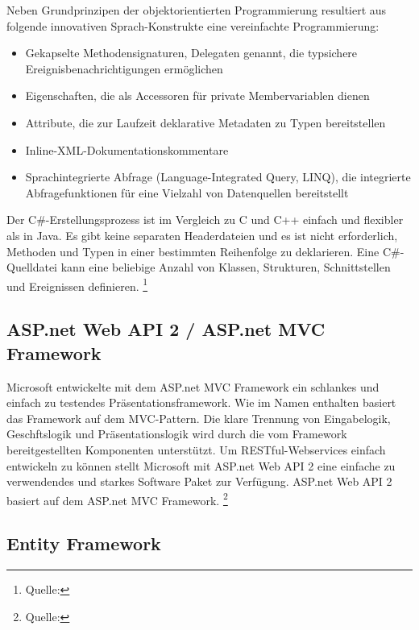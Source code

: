 Neben Grundprinzipen der objektorientierten Programmierung resultiert
aus folgende innovativen Sprach-Konstrukte eine vereinfachte
Programmierung:

\begin{itemize}
\tightlist
\item
  Gekapselte Methodensignaturen, Delegaten genannt, die typsichere
  Ereignisbenachrichtigungen ermöglichen
\item
  Eigenschaften, die als Accessoren für private Membervariablen dienen
\item
  Attribute, die zur Laufzeit deklarative Metadaten zu Typen
  bereitstellen
\item
  Inline-XML-Dokumentationskommentare
\item
  Sprachintegrierte Abfrage (Language-Integrated Query, LINQ), die
  integrierte Abfragefunktionen für eine Vielzahl von Datenquellen
  bereitstellt
\end{itemize}

Der C\#-Erstellungsprozess ist im Vergleich zu C und C++ einfach und
flexibler als in Java. Es gibt keine separaten Headerdateien und es ist
nicht erforderlich, Methoden und Typen in einer bestimmten Reihenfolge
zu deklarieren. Eine C\#-Quelldatei kann eine beliebige Anzahl von
Klassen, Strukturen, Schnittstellen und Ereignissen definieren.
\footnote{Quelle:\autocite{csharpbasic}}

\subsection{ASP.net Web API 2 / ASP.net MVC
Framework}\label{asp.net-web-api-2-asp.net-mvc-framework}

Microsoft entwickelte mit dem ASP.net MVC Framework ein schlankes und
einfach zu testendes Präsentationsframework. Wie im Namen enthalten
basiert das Framework auf dem MVC-Pattern. Die klare Trennung von
Eingabelogik, Geschftslogik und Präsentationslogik wird durch die vom
Framework bereitgestellten Komponenten unterstützt. Um
RESTful-Webservices einfach entwickeln zu können stellt Microsoft mit
ASP.net Web API 2 eine einfache zu verwendendes und starkes Software
Paket zur Verfügung. ASP.net Web API 2 basiert auf dem ASP.net MVC
Framework. \footnote{Quelle:\autocite{csharpbasic}}

\newpage

\subsection{Entity Framework}\label{entity-framework}

